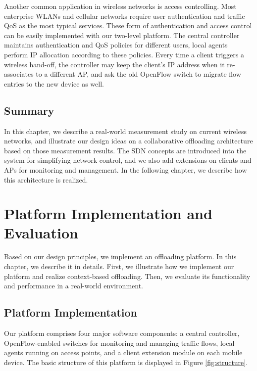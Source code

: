 \documentclass[english]{tktltiki}
\begin{document}
Another common application in wireless networks is access controlling. Most enterprise WLANs and cellular networks require user authentication and traffic QoS as the most typical services. These form of authentication and access control can be easily implemented with our two-level platform. The central controller maintains authentication and QoS policies for different users, local agents perform IP allocation according to these policies. Every time a client triggers a wireless hand-off, the controller may keep the client's IP address when it re-associates to a different AP, and ask the old OpenFlow switch to migrate flow entries to the new device as well.


\subsection{Summary}

In this chapter, we describe a real-world measurement study on current wireless networks, and illustrate our design ideas on a collaborative offloading architecture based on those measurement results. The SDN concepts are introduced into the system for simplifying network control, and we also add extensions on clients and APs for monitoring and management. In the following chapter, we describe how this architecture is realized.


\newpage







\section{Platform Implementation and Evaluation}

Based on our design principles, we implement an offloading platform. In this chapter, we describe it in details. First, we illustrate how we implement our platform and realize context-based offloading. Then, we evaluate its functionality and performance in a real-world environment.

\subsection{Platform Implementation}

Our platform comprises four major software components: a central controller, OpenFlow-enabled switches for monitoring and managing traffic flows, local agents running on access points, and a client extension module on each mobile device. The basic structure of this platform is displayed in Figure \ref{fig:structure}.
\end{document}
